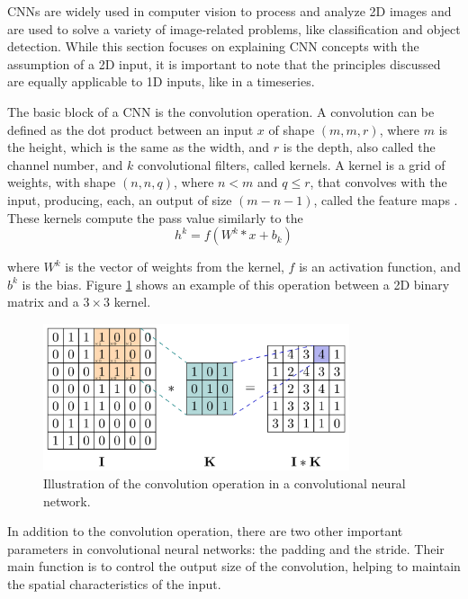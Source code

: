 CNNs are widely used in computer vision to process and analyze 2D images and are used to solve a variety of image-related problems, like classification and object detection. While this section focuses on explaining CNN concepts with the assumption of a 2D input, it is important to note that the principles discussed are equally applicable to 1D inputs, like in a timeseries.

The basic block of a CNN is the convolution operation. A convolution can be defined as the dot product between an input $x$ of shape $(m,m,r)$, where $m$ is the height, which is the same as the width, and $r$ is the depth, also called the channel number, and $k$ convolutional filters, called kernels. A kernel is a grid of weights, with shape $(n,n, q)$, where $n < m$ and $q \leq r$, that convolves with the input, producing, each, an output of size $(m-n-1)$, called the feature maps \cite{Alzubaidi_Zhang_Humaidi_Al_Dujaili_Duan_Al_Shamma_Santamaria_Fadhel_Al_Amidie_Farhan_2021}. These kernels compute the pass value similarly to the 
\begin{equation}
    h^k = f\left(W^k * x + b_k\right)
\end{equation}

where $W^k$ is the vector of weights from the kernel, $f$ is an activation function, and $b^k$ is the bias. Figure \ref{fig:conv-example} shows an example of this operation between a 2D binary matrix and a $3\times3$ kernel. 

\begin{figure}[H]
    \centering
    \includegraphics[width=9cm]{Cap2_LitReview/model_basics/Convolutional_NN/conv2d.png}
    \caption{Illustration of the convolution operation in a convolutional neural network. \cite{Riebesell_2022}}
    \label{fig:conv-example}
\end{figure}

In addition to the convolution operation, there are two other important parameters in convolutional neural networks: the padding and the stride. Their main function is to control the output size of the convolution, helping to maintain the spatial characteristics of the input. 

